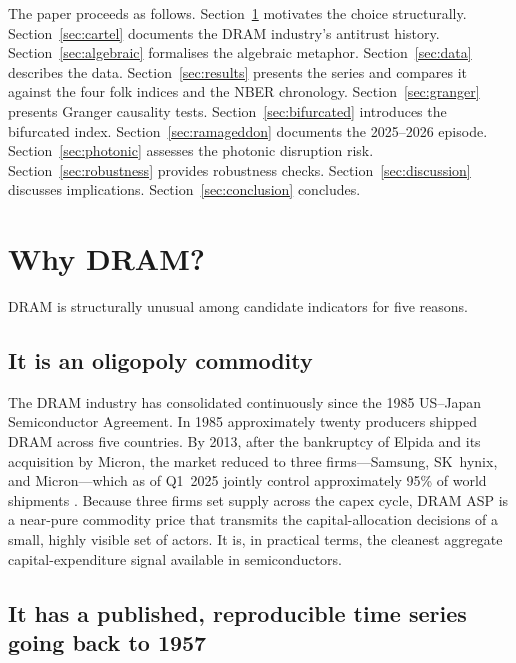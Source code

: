 \documentclass[12pt]{article}
\theoremstyle{definition}
\begin{document}
The paper proceeds as follows. Section~\ref{sec:why_dram} motivates the choice structurally. Section~\ref{sec:cartel} documents the DRAM industry's antitrust history. Section~\ref{sec:algebraic} formalises the algebraic metaphor. Section~\ref{sec:data} describes the data. Section~\ref{sec:results} presents the series and compares it against the four folk indices and the NBER chronology. Section~\ref{sec:granger} presents Granger causality tests. Section~\ref{sec:bifurcated} introduces the bifurcated index. Section~\ref{sec:ramageddon} documents the 2025--2026 episode. Section~\ref{sec:photonic} assesses the photonic disruption risk. Section~\ref{sec:robustness} provides robustness checks. Section~\ref{sec:discussion} discusses implications. Section~\ref{sec:conclusion} concludes.


\section{Why DRAM?}
\label{sec:why_dram}

DRAM is structurally unusual among candidate indicators for five reasons.

\subsection{It is an oligopoly commodity}
\label{subsec:oligopoly}

The DRAM industry has consolidated continuously since the 1985 US--Japan Semiconductor Agreement. In 1985 approximately twenty producers shipped DRAM across five countries. By 2013, after the bankruptcy of Elpida and its acquisition by Micron, the market reduced to three firms---Samsung, SK~hynix, and Micron---which as of Q1~2025 jointly control approximately 95\% of world shipments \cite{Lapedus2025,NoobFeed2024}. Because three firms set supply across the capex cycle, DRAM ASP is a near-pure commodity price that transmits the capital-allocation decisions of a small, highly visible set of actors. It is, in practical terms, the cleanest aggregate capital-expenditure signal available in semiconductors.

\subsection{It has a published, reproducible time series going back to 1957}
\end{document}
